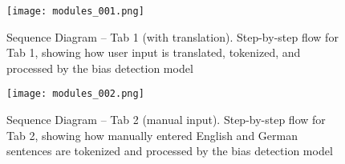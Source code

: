     \vspace{0.8em}
    \begin{figure}[H]
    \centering
    \texttt{[image: modules\_001.png]}
    \caption[Sequence Diagram – Tab 1 (with translation)]{Sequence Diagram – Tab 1 (with translation). Step-by-step flow for Tab 1, showing how user input is translated, tokenized, and processed by the bias detection model}
    \label{fig:sequence_diagram_1}
    \end{figure}

    \begin{figure}[H]
    \centering
    \texttt{[image: modules\_002.png]}
    \caption[Sequence Diagram – Tab 2 (manual input)]{Sequence Diagram – Tab 2 (manual input). Step-by-step flow for Tab 2, showing how manually entered English and German sentences are tokenized and processed by the bias detection model}
    \label{fig:sequence_diagram_2}
    \end{figure}
